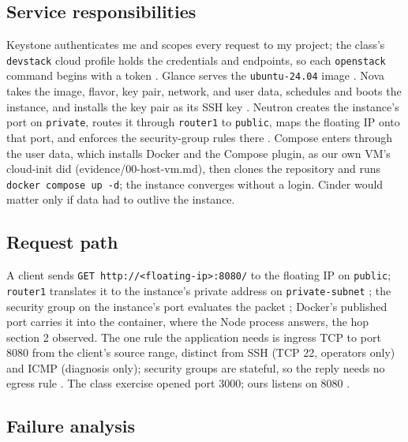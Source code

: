 \documentclass[11pt,letterpaper]{article}
\newcommand{\code}[1]{\texttt{#1}}
\begin{document}
\subsection{Service responsibilities}

Keystone authenticates me and scopes every request to my project; the class's \code{devstack} cloud profile holds the credentials and endpoints, so each \code{openstack} command begins with a token \cite{os-keystone,ex05}. Glance serves the \code{ubuntu-24.04} image \cite{os-glance}. Nova takes the image, flavor, key pair, network, and user data, schedules and boots the instance, and installs the key pair as its SSH key \cite{os-nova}. Neutron creates the instance's port on \code{private}, routes it through \code{router1} to \code{public}, maps the floating IP onto that port, and enforces the security-group rules there \cite{os-neutron}. Compose enters through the user data, which installs Docker and the Compose plugin, as our own VM's cloud-init did (evidence/00-host-vm.md), then clones the repository and runs \code{docker compose up -d}; the instance converges without a login. Cinder would matter only if data had to outlive the instance.

\subsection{Request path}

A client sends \code{GET http://<floating-ip>:8080/} to the floating IP on \code{public}; \code{router1} translates it to the instance's private address on \code{private-subnet} \cite{os-floating}; the security group on the instance's port evaluates the packet \cite{os-secgroups}; Docker's published port carries it into the container, where the Node process answers, the hop section 2 observed. The one rule the application needs is ingress TCP to port 8080 from the client's source range, distinct from SSH (TCP 22, operators only) and ICMP (diagnosis only); security groups are stateful, so the reply needs no egress rule \cite{os-secgroups}. The class exercise opened port 3000; ours listens on 8080 \cite{ex05}.

\subsection{Failure analysis}
\end{document}
